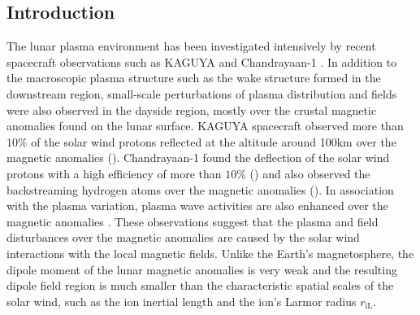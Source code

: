 \documentclass[draft,jgrga]{agutex2015}
\begin{document}
%

\begin{article}

%
%

\section{Introduction}
The lunar plasma environment has been  investigated 
intensively by recent spacecraft observations  such as
KAGUYA \citep[e.g.][]{Saito2008,Saito2010,Saito2012} and
Chandrayaan-1 \citep[e.g.][]{Barabash2009,Bhardwaj2010}.
In addition to the macroscopic plasma structure
such as the wake structure formed in the downstream region,
small-scale perturbations of plasma distribution and fields were also
 observed in the dayside region,
mostly over the crustal magnetic anomalies found on the lunar surface.
KAGUYA spacecraft observed
more than $10 \%$ of the solar wind protons reflected at the altitude around 100km
over the magnetic anomalies (\cite{Saito2010}).
Chandrayaan-1 found the deflection of the solar wind protons with
a high efficiency of more than $ 10 \%$ (\cite{Lue2011}) and
also observed the backstreaming hydrogen atoms over the magnetic anomalies (\cite{Wieser2010}).
In association with the plasma variation,
plasma wave activities are also enhanced over the magnetic anomalies
\citep[e.g.][]{Halekas2006a,Hashimoto2010}.
These observations suggest that the plasma and field disturbances over
the magnetic anomalies are caused by the solar wind interactions
with the local magnetic fields.
Unlike the Earth's magnetosphere, %
the dipole moment of
the lunar magnetic anomalies is very weak and
the resulting dipole field region is much smaller than the characteristic spatial scales
of the solar wind, such as the ion inertial length and the ion's Larmor radius $r_\mathrm{iL}$.




\end{article}
\end{document}
